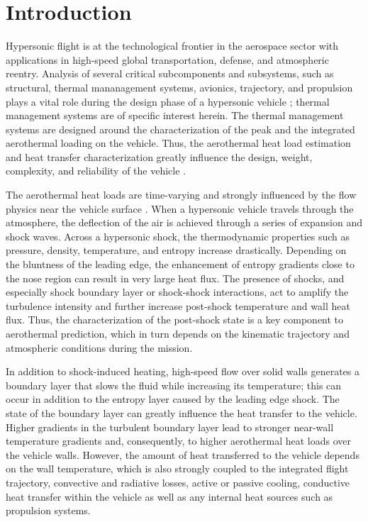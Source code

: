 \documentclass[%
 aip,
 amsmath,amssymb,
preprint,%
]{revtex4-1}
\begin{document}
\maketitle


\section{ Introduction}
Hypersonic flight is at the technological frontier in the aerospace sector with applications in high-speed global transportation, defense, and atmospheric reentry. Analysis of several critical subcomponents and subsystems, such as structural, thermal mananagement systems, avionics, trajectory, and propulsion plays a vital role during the design phase of a hypersonic vehicle \citep{sziroczak_review_2016}; thermal management systems are of specific interest herein. The thermal management systems are designed around the characterization of the peak and the integrated aerothermal loading on the vehicle.  Thus, the aerothermal heat load estimation and heat transfer characterization greatly influence the design, weight, complexity, and reliability of the vehicle \citep{schmisseur_hypersonics_2015,yang_heat_2021}.

The aerothermal heat loads are time-varying and strongly influenced by the flow physics near the vehicle surface \citep{anderson_hypersonic_2019}. When a hypersonic vehicle travels through the atmosphere, the deflection of the air is achieved through a series of expansion and shock waves. 
Across a hypersonic shock, the thermodynamic properties such as pressure, density, temperature, and entropy increase drastically. Depending on the bluntness of the leading edge, the enhancement of entropy gradients close to the nose region can result in very large heat flux. The presence of shocks, and especially shock boundary layer or shock-shock interactions, act to amplify the turbulence intensity and further increase post-shock temperature and wall heat flux.  Thus, the characterization of the post-shock state is a key component to aerothermal prediction, which in turn depends on the kinematic trajectory and atmospheric conditions during the mission.

In addition to shock-induced heating, high-speed flow over solid walls generates a boundary layer that slows the fluid while increasing its temperature; this can occur in addition to the entropy layer caused by the leading edge shock. The state of the boundary layer can greatly influence the heat transfer to the vehicle.  Higher gradients in the turbulent boundary layer lead to stronger near-wall temperature gradients and, consequently, to higher aerothermal heat loads over the vehicle walls. However, the amount of heat transferred to the vehicle depends on the wall temperature, which is also strongly coupled to the integrated flight trajectory, convective and radiative losses, active or passive cooling, conductive heat transfer within the vehicle as well as any internal heat sources such as propulsion systems. 
\end{document}
